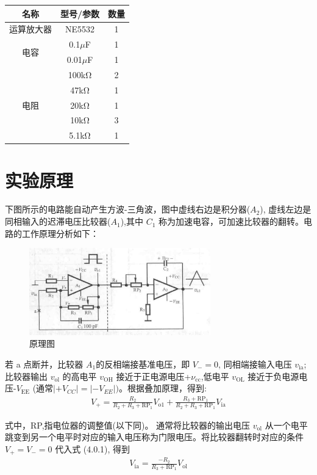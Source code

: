 \documentclass[a4paper,11pt,UTF8]{article}
\numberwithin{equation}{subsection}
\begin{document}
\begin{table}[h]
	\centering
	\begin{tabular}{|c|c|c|}
		\hline
		名称 & 型号/参数 & 数量\\
		\hline
		运算放大器 & NE5532 & 1\\
		\hline
		\multirow{2}{*}{电容} & 0.1$\mu$F & 1 \\
		\cline{2-3}
		& 0.01$\mu$F & 1\\
		\hline
		\multirow{5}{*}{电阻} & 100kΩ & 2 \\
		\cline{2-3}
		& 47kΩ & 1\\
		\cline{2-3}
		& 20kΩ & 1\\
		\cline{2-3}
		& 10kΩ & 3\\
		\cline{2-3}
		& 5.1kΩ & 1\\
		\hline 		
	\end{tabular}
\end{table}
\section{实验原理}
下图所示的电路能自动产生方波-三角波，图中虚线右边是积分器($A_2$), 虚线左边是同相输入的迟滞电压比较器($A_1$),其中 $C_1$ 称为加速电容，可加速比较器的翻转。电路的工作原理分析如下：
\begin{figure}[H]
	\centering
	\includegraphics[width=0.7\textwidth]{4}
	\caption{原理图}
\end{figure}
若 a 点断并，比较器 $A_1$的反相端接基准电压，即 $V_-=0$, 同相端接输入电压 $v_\mathrm{ia}$; 比较器输出 $v_\mathrm{ol}$ 的高电平 $v_\mathrm{OH}$ 接近于正电源电压+$\nu_\mathrm{cc}$,低电平 $v_\mathrm{OL}$ 接近于负电源电压-$V_\mathrm{EE}$ (通常$|+V_{CC}|=|-V_{EE}|)$。根据叠加原理，得到:
\begin{align}
	V_{+}=\frac{R_{2}}{R_{2}+R_{3}+\mathrm{RP}_{1}}V_{\mathrm{o1}}+\frac{R_{3}+\mathrm{RP}_{1}}{R_{2}+R_{3}+\mathrm{RP}_{1}}V_{\mathrm{ia}}
\end{align}

式中，RP,指电位器的调整值(以下同)。
通常将比较器的输出电压 $v_\mathrm{ol}$ 从一个电平跳变到另一个电平时对应的输入电压称为门限电压。将比较器翻转时对应的条件 $V_+=V_-=0$ 代入式 (4.0.1), 得到
\begin{align}
	V_{\mathrm{ia}}=\frac{-R_{2}}{R_{3}+\mathrm{RP}_{1}}V_{\mathrm{ol}}
\end{align}
\end{document}
